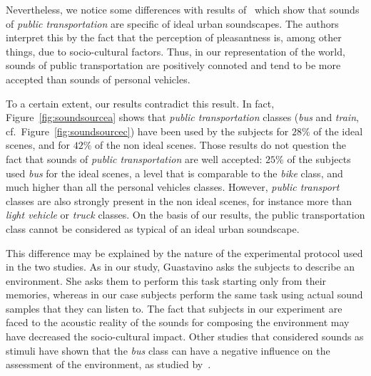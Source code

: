 \documentclass[12pt]{elsarticle}
\newcommand{\cf}{cf.}
\begin{document}
Nevertheless, we notice some differences with results of~\cite{guastavino2006ideal} which show that sounds of \emph{public transportation} are specific of ideal urban soundscapes. The authors interpret this by the fact that the perception of pleasantness is, among other things, due to socio-cultural factors. Thus, in our representation of the world, sounds of public transportation are positively connoted and tend to be more accepted than sounds of personal vehicles.

To a certain extent, our results contradict this result. In fact,  Figure~\ref{fig:soundsourcea} shows that \emph{public transportation} classes (\emph{bus} and \emph{train}, \cf~Figure~\ref{fig:soundsourcec}) have been used by the subjects for $28\%$ of the ideal scenes, and for $42\%$ of the non ideal scenes. Those results do not question the fact that sounds of \emph{public transportation} are well accepted: $25\%$ of the subjects used \emph{bus} for the ideal scenes, a level that is comparable to the \emph{bike} class, and much higher than all the personal vehicles classes. However, \emph{public transport} classes are also strongly present in the non ideal scenes, for instance more than \emph{light vehicle} or \emph{truck} classes. On the basis of our results, the public transportation class cannot be considered as typical of an ideal urban soundscape.


This difference may be explained by the nature of the experimental protocol used in the two studies. As in our study, Guastavino asks the subjects to describe an environment. She asks them to perform this task starting only from their memories, whereas in our case subjects perform the same task using actual sound samples that they can listen to. The fact that subjects in our experiment are faced to the acoustic reality of the sounds for composing the environment may have decreased the socio-cultural impact. Other studies that considered sounds as stimuli have shown that the \emph{bus} class can have a negative influence on the assessment of the environment, as studied by~\cite{lavandier2006contribution}.
\end{document}
